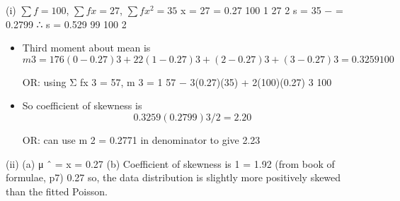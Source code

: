 \documentclass[a4paper,12pt]{article}
\begin{document}
(i)
$\sum f = 100$, $\sum  fx = 27$, $\sum fx^2 = 35$
x =
27
= 0.27
100
1
27 2
s = {35 −
} = 0.2799 ∴ s = 0.529
99
100
2
\begin{itemize}
\item Third moment about mean is
\[m 3 =
1
{76(0 − 0.27) 3 + 22(1 − 0.27) 3 + (2 − 0.27) 3 + (3 − 0.27) 3 } = 0.3259
100\]
\item [OR: using Σ fx 3 = 57, m 3 =
1
{57 − 3(0.27)(35) + 2(100)(0.27) 3 } ]
100
\item So coefficient of skewness is
\[0.3259
(0.2799) 3/2
= 2.20\]
\item [OR: can use m 2 = 0.2771 in denominator to give 2.23 ]

\end{itemize}
(ii)
(a) μ ˆ = x = 0.27
(b) Coefficient of skewness is
1
= 1.92 (from book of formulae, p7)
0.27
so, the data distribution is slightly more positively skewed than the fitted Poisson.

\end{document}

